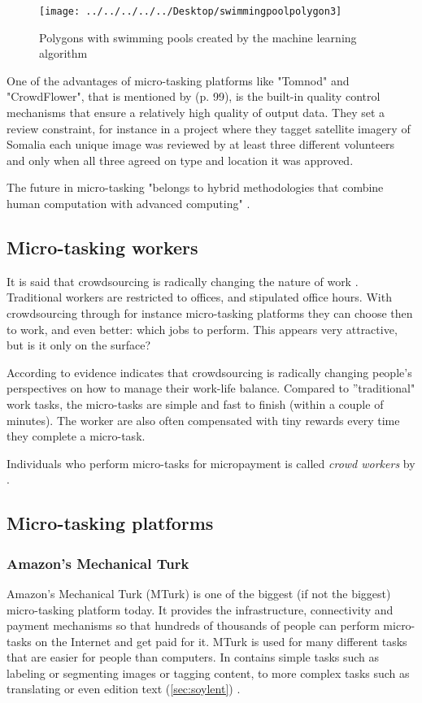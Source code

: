 \begin{figure}[H]
	\centering
	\texttt{[image: ../../../../../Desktop/swimmingpoolpolygon3]}
	\caption{Polygons with swimming pools created by the machine learning algorithm \citep{Nikki2016}}
	\label{fig:swimmingpoolpolygon3}
\end{figure}

One of the advantages of micro-tasking platforms like "Tomnod" and "CrowdFlower", that is mentioned by \cite{Meier2013} (p. 99), is the built-in quality control mechanisms that ensure a relatively high quality of output data. They set a review constraint, for instance in a project where they tagget satellite imagery of Somalia each unique image was reviewed by at least three different volunteers and only when all three agreed on type and location it was approved. 

The future in micro-tasking "belongs to hybrid methodologies that combine human computation with advanced computing" \citep{Meier2013}. 

\subsection{Micro-tasking workers}
It is said that crowdsourcing is radically changing the nature of work \citep{Deng2016a}. Traditional workers are restricted to offices, and stipulated office hours. With crowdsourcing through for instance micro-tasking platforms they can choose then to work, and even better: which jobs to perform. This appears very attractive, but is it only on the surface? 

According to \cite{Deng2016a} evidence indicates that crowdsourcing is radically changing people's perspectives on how to manage their work-life balance. Compared to ''traditional" work tasks, the micro-tasks are simple and fast to finish (within a couple of minutes). The worker are also often compensated with tiny rewards every time they complete a micro-task.  

Individuals who perform micro-tasks for micropayment is called \textit{crowd workers} by \citep{Deng2016a}. 

\subsection{Micro-tasking platforms}
\subsubsection[MTurk]{Amazon's Mechanical Turk}
Amazon's Mechanical Turk (MTurk) is one of the biggest (if not the biggest) micro-tasking platform today. It provides the infrastructure, connectivity and payment mechanisms so that hundreds of thousands of people can perform micro-tasks on the Internet and get paid for it. MTurk is used for many different tasks that are easier for people than computers. In contains simple tasks such as labeling or segmenting images or tagging content, to more complex tasks such as translating or even edition text (\ref{sec:soylent}) \citep{Franklin2011}.  

